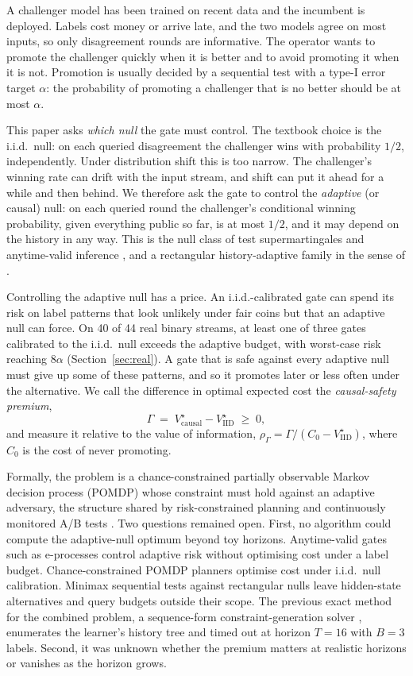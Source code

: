 \documentclass{article}
\theoremstyle{plain}
\theoremstyle{definition}
\theoremstyle{remark}
\newcommand{\Vc}{V^\star_{\mathrm{causal}}}
\newcommand{\Vi}{V^\star_{\mathrm{IID}}}
\newcommand{\rhoG}{\rho_\Gamma}
\begin{document}
A challenger model has been trained on recent data and the incumbent is deployed. Labels cost money or arrive late, and the two models agree on most inputs, so only disagreement rounds are informative. The operator wants to promote the challenger quickly when it is better and to avoid promoting it when it is not. Promotion is usually decided by a sequential test with a type-I error target $\alpha$: the probability of promoting a challenger that is no better should be at most $\alpha$.

This paper asks \emph{which null} the gate must control. The textbook choice is the i.i.d.\ null: on each queried disagreement the challenger wins with probability $1/2$, independently. Under distribution shift this is too narrow. The challenger's winning rate can drift with the input stream, and shift can put it ahead for a while and then behind. We therefore ask the gate to control the \emph{adaptive} (or causal) null: on each queried round the challenger's conditional winning probability, given everything public so far, is at most $1/2$, and it may depend on the history in any way. This is the null class of test supermartingales and anytime-valid inference \citep{ramdas2023gametheoretic,waudbysmith2024betting}, and a rectangular history-adaptive family in the sense of \citet{fauss2020minimax}.

Controlling the adaptive null has a price. An i.i.d.-calibrated gate can spend its risk on label patterns that look unlikely under fair coins but that an adaptive null can force. On 40 of 44 real binary streams, at least one of three gates calibrated to the i.i.d.\ null exceeds the adaptive budget, with worst-case risk reaching $8\alpha$ (Section~\ref{sec:real}). A gate that is safe against every adaptive null must give up some of these patterns, and so it promotes later or less often under the alternative. We call the difference in optimal expected cost the \emph{causal-safety premium},
\[
\Gamma \;=\; \Vc - \Vi \;\ge\; 0,
\]
and measure it relative to the value of information, $\rhoG = \Gamma/(C_0 - \Vi)$, where $C_0$ is the cost of never promoting.

Formally, the problem is a chance-constrained partially observable Markov decision process (POMDP) whose constraint must hold against an adaptive adversary, the structure shared by risk-constrained planning \citep{ono2015chance} and continuously monitored A/B tests \citep{johari2022always}. Two questions remained open. First, no algorithm could compute the adaptive-null optimum beyond toy horizons. Anytime-valid gates such as e-processes control adaptive risk without optimising cost under a label budget. Chance-constrained POMDP planners optimise cost under i.i.d.\ null calibration. Minimax sequential tests against rectangular nulls \citep{fauss2020minimax} leave hidden-state alternatives and query budgets outside their scope. The previous exact method for the combined problem, a sequence-form constraint-generation solver \citep{bosansky2014exact}, enumerates the learner's history tree and timed out at horizon $T=16$ with $B=3$ labels. Second, it was unknown whether the premium matters at realistic horizons or vanishes as the horizon grows.
\end{document}

